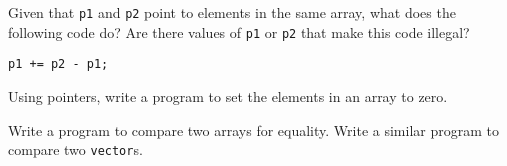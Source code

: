 %
%
\begin{question}
Given that \verb|p1| and \verb|p2| point to elements in the same array,
what does the following code do? Are there values of \verb|p1| or \verb|p2| that make
this code illegal?
\begin{lstlisting}
p1 += p2 - p1;
\end{lstlisting}
\end{question}

\begin{question}
Using pointers, write a program to set the elements in an array to zero.
\end{question}

\begin{question}
Write a program to compare two arrays for equality. Write a similar program to compare two \verb|vector|s.
\end{question}
